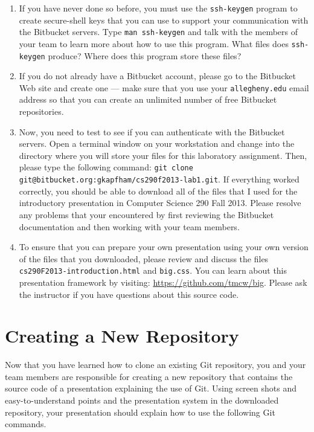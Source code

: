 \begin{enumerate}
	\item If you have never done so before, you must use the {\tt ssh-keygen} program to create secure-shell keys that
		you can use to support your communication with the Bitbucket servers.  Type {\tt man ssh-keygen} and talk with
		the members of your team to learn more about how to use this program.  What files does {\tt ssh-keygen} produce? 
		Where does this program store these files?

	\item If you do not already have a Bitbucket account, please go to the Bitbucket Web site and create one --- 
		make sure that you use your {\tt allegheny.edu} email address so that you can create an unlimited number of free
		Bitbucket repositories.

	\item Now, you need to test to see if you can authenticate with the Bitbucket servers.  Open a terminal window on
		your workstation and change into the directory where you will store your files for this laboratory assignment.
		Then, please type the following command: {\tt git clone git@bitbucket.org:gkapfham/cs290f2013-lab1.git}.  If
		everything worked correctly, you should be able to download all of the files that I used for the introductory
		presentation in Computer Science 290 Fall 2013. Please resolve any problems that your encountered by first
		reviewing the Bitbucket documentation and then working with your team members.

	\item To ensure that you can prepare your own presentation using your own version of the files that you downloaded, please review
		and discuss the files {\tt cs290F2013-introduction.html} and {\tt big.css}. You can learn about this
		presentation framework by visiting: \url{https://github.com/tmcw/big}. Please ask the instructor if you have
		questions about this source code.

\end{enumerate}

\section*{Creating a New Repository}

Now that you have learned how to clone an existing Git repository, you and your team members are responsible for
creating a new repository that contains the source code of a presentation explaining the use of Git. Using screen shots
and easy-to-understand points and the presentation system in the downloaded repository, your presentation should explain
how to use the following Git commands. 

